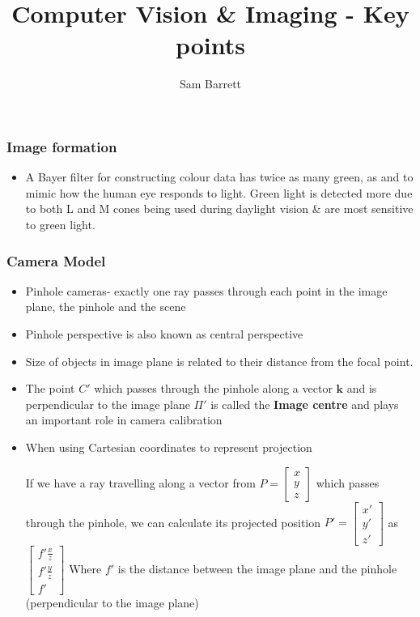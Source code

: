 \documentclass{beamer}
\title{Computer Vision \& Imaging - Key points}
\author{Sam Barrett}
\newcommand{\bl}{\color{black}}
\begin{document}
\begin{frame}
  \frametitle{Image formation}
  \begin{itemize}
    \item A Bayer filter for constructing colour data has twice as many \color{green} green, \bl as \color{red}{red} \bl and \color{blue}{blue} \bl to mimic how the human eye responds to light.
          Green light is detected more due to both L and M cones being used during daylight vision \& are most sensitive to green light.
  \end{itemize}

\end{frame}

  \begin{frame}[allowframebreaks]
    \frametitle{Camera Model}

    \begin{itemize}
      \item Pinhole cameras- exactly one ray passes through each point in the image plane, the pinhole and the scene

      \item Pinhole perspective is also known as central perspective
      \item Size of objects in image plane is related to their distance from the focal point.

      \item The point $C'$ which passes through the pinhole along a vector $\mathbf{k} $ and is perpendicular to the image plane $\Pi'$ is called the \textbf{Image centre} and plays an important role in camera calibration

\framebreak
      \item When using Cartesian coordinates to represent projection

            If we have a ray travelling along a vector from $P = \begin{bmatrix}
x \\ y\\ z
            \end{bmatrix}$ which passes through the pinhole, we can calculate its projected position $P' = \begin{bmatrix}
              x' \\ y' \\ z'
            \end{bmatrix}$ as $\begin{bmatrix}
f' \frac{x}{z} \\ f' \frac{y}{z} \\ f'
\end{bmatrix}$ Where $f'$ is the distance between the image plane and the pinhole (perpendicular to the image plane)


\end{itemize}
\end{frame}
\end{document}
